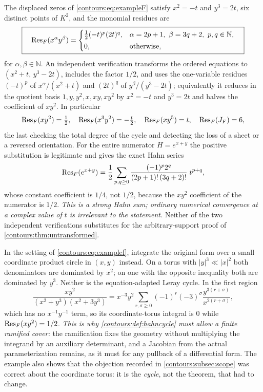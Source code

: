 \documentclass[11pt,letterpaper]{article}
\theoremstyle{definition}
\theoremstyle{remark}
\newcommand{\N}{\mathbb N}\newcommand{\Z}{\mathbb Z}\newcommand{\DD}{\mathbb D}
\numberwithin{equation}{section}
\begin{document}
\begin{example}
The displaced zeros of \eqref{contours:eq:exampleF} satisfy $x^2=-t$ and
$y^3=2t$, six distinct points of $K^2$, and the monomial residues are
\begin{equation}\label{contours:eq:examplemonomials}
 \boxed{\quad
  \Res_F(x^\alpha y^\beta)=
  \begin{cases}
    \tfrac12(-t)^{p}(2t)^{q},
      &\alpha=2p+1,\ \beta=3q+2,\ p,q\in\N,\\[2pt]
    0,&\text{otherwise},
  \end{cases}\quad}
\end{equation}
for $\alpha,\beta\in\N$. An independent verification transforms the ordered
equations to $(x^2+t,\,y^3-2t)$, includes the factor $1/2$, and uses the
one-variable residues $(-t)^p$ of $x^\alpha/(x^2+t)$ and $(2t)^q$ of
$y^\beta/(y^3-2t)$; equivalently it reduces in the quotient basis
$1,y,y^2,x,xy,xy^2$ by $x^2=-t$ and $y^3=2t$ and halves the coefficient of
$xy^2$. In particular
\[
  \operatorname{Res}_F(xy^2)=\tfrac12,\quad
  \operatorname{Res}_F(x^3y^2)=-\tfrac t2,\quad
  \operatorname{Res}_F(xy^5)=t,\quad
  \operatorname{Res}_F(J_F)=6 ,
\]
the last checking the total degree of the cycle and detecting the loss of a
sheet or a reversed orientation. For the entire numerator $H=e^{x+y}$ the
positive substitution is legitimate and gives the exact Hahn series
\begin{equation}\label{contours:eq:exampleexp}
  \operatorname{Res}_F(e^{x+y})
  =\frac12\sum_{p,q\ge0}
   \frac{(-1)^p2^q}{(2p+1)!\,(3q+2)!}\;t^{p+q},
\end{equation}
whose constant coefficient is $1/4$, not $1/2$, because the $xy^2$ coefficient
of the numerator is $1/2$. \emph{This is a strong Hahn sum; ordinary numerical
convergence at a complex value of $t$ is irrelevant to the statement.} Neither
of the two independent verifications substitutes for the arbitrary-support proof
of \cref{contours:thm:untransformed}.
\end{example}

\begin{example}
\label{contours:ex:wrongtorus}
In the setting of \eqref{contours:eq:examplef}, integrate the original form over
a small coordinate product circle in $(x,y)$ instead. On a torus with
$|y|^3\ll|x|^2$ both denominators are dominated by $x^2$; on one with the
opposite inequality both are dominated by $y^3$. Neither is the
equation-adapted Leray cycle. In the first region
\[
  \frac{xy^2}{(x^2+y^3)(x^2+3y^3)}
  =x^{-3}y^2\sum_{r,\sigma\ge0}(-1)^r(-3)^\sigma
   \frac{y^{3(r+\sigma)}}{x^{2(r+\sigma)}},
\]
which has no $x^{-1}y^{-1}$ term, so its coordinate-torus integral is $0$ while
$\operatorname{Res}_F(xy^2)=1/2$. \emph{This is why \cref{contours:def:hahncycle} must allow a
finite ramified cover:} the ramification fixes the geometry without multiplying
the integrand by an auxiliary determinant, and a Jacobian from the actual
parameterization remains, as it must for any pullback of a differential form.
The example also shows that the objection recorded in
\cref{contours:subsec:scope} was correct about the coordinate torus: it is the
\emph{cycle}, not the theorem, that had to change.
\end{example}
\end{document}
